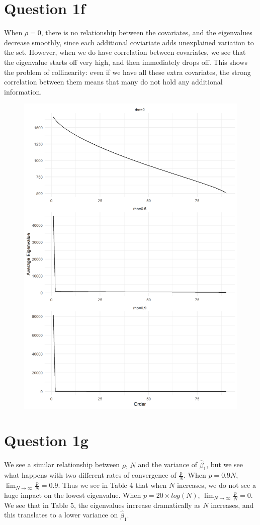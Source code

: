 \documentclass[reqno,12pt,notitlepage]{article}
\begin{document}
\section*{Question 1f}
When $\rho = 0$, there is no relationship between the covariates, and the eigenvalues decrease smoothly, since each additional coviariate adds unexplained variation to the set. However, when we do have correlation between covariates, we see that the eigenvalue starts off very high, and then immediately drops off. This shows the problem of collinearity: even if we have all these extra covariates, the strong correlation between them means that many do not hold any additional information.

\begin{figure}[H]
    \centering
    \includegraphics[width=.6\textwidth]{part_f.png}
\end{figure}

\newpage
\section*{Question 1g}

We see a similar relationship between $\rho$, $N$ and the variance of $\hat{\beta}_1$, but we see what happens with two different rates of convergence of $\frac{p}{N}$. When $p=0.9N$, $\lim_{N\rightarrow \infty} \frac{p}{N} = 0.9$. Thus we see in Table 4 that when $N$ increases, we do not see a huge impact on the lowest eigenvalue. When $p=20\times log(N)$, $\lim_{N\rightarrow \infty} \frac{p}{N} = 0$. We see that in Table 5, the eigenvalues increase dramatically as $N$ increases, and this translates to a lower variance on $\hat{\beta}_1$.


\begin{table}[H]
    \centering
    \caption{$p=0.9N$}
    
\end{table}


\begin{table}[H]
    \centering
    \caption{$p=20\times log(N)$}
    
\end{table}
\end{document}
